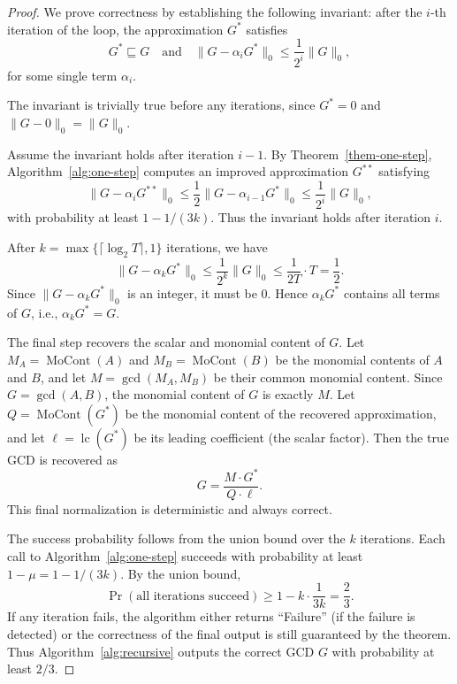\documentclass{article}
\numberwithin{equation}{section}
\begin{document}
\begin{proof}
We prove correctness by establishing the following invariant: after the $i$-th iteration of the loop, the approximation $G^*$ satisfies
\[
G^* \sqsubseteq G \quad \text{and} \quad \|G - \alpha_i G^*\|_0 \le \frac{1}{2^i} \|G\|_0,
\]
for some single term $\alpha_i$.

The invariant is trivially true before any iterations, since $G^* = 0$ and $\|G - 0\|_0 = \|G\|_0$.

Assume the invariant holds after iteration $i-1$. By Theorem~\ref{them-one-step}, Algorithm~\ref{alg:one-step} computes an improved approximation $G^{**}$ satisfying
\[
\|G - \alpha_{i} G^{**}\|_0 \le \frac{1}{2} \|G - \alpha_{i-1} G^*\|_0 \le \frac{1}{2^i} \|G\|_0,
\]
with probability at least $1 - 1/(3k)$. Thus the invariant holds after iteration $i$.

After $k = \max\{\lceil \log_2 T \rceil,1\}$ iterations, we have
\[
\|G - \alpha_k G^*\|_0 \le \frac{1}{2^k} \|G\|_0 \le \frac{1}{2T} \cdot T = \frac{1}{2}.
\]
Since $\|G - \alpha_k G^*\|_0$ is an integer, it must be $0$. Hence $\alpha_k G^*$ contains all terms of $G$, i.e., $\alpha_k G^* = G$.

The final step recovers the scalar and monomial content of $G$. Let $M_A = \operatorname{MoCont}(A)$ and $M_B = \operatorname{MoCont}(B)$ be the monomial contents of $A$ and $B$, and let $M = \gcd(M_A, M_B)$ be their common monomial content. Since $G = \gcd(A,B)$, the monomial content of $G$ is exactly $M$. Let $Q = \operatorname{MoCont}(G^*)$ be the monomial content of the recovered approximation, and let $\ell = \operatorname{lc}(G^*)$ be its leading coefficient (the scalar factor). Then the true GCD is recovered as
\[
G = \frac{M \cdot G^*}{Q \cdot \ell}.
\]
This final normalization is deterministic and always correct.

The success probability follows from the union bound over the $k$ iterations. Each call to Algorithm~\ref{alg:one-step} succeeds with probability at least $1 - \mu = 1 - 1/(3k)$. By the union bound,
\[
\Pr(\text{all iterations succeed}) \ge 1 - k \cdot \frac{1}{3k} = \frac{2}{3}.
\]
If any iteration fails, the algorithm either returns ``Failure'' (if the failure is detected) or the correctness of the final output is still guaranteed by the theorem. 
%
Thus Algorithm~\ref{alg:recursive} outputs the correct GCD $G$ with probability at least $2/3$.
\end{proof}
\end{document}
